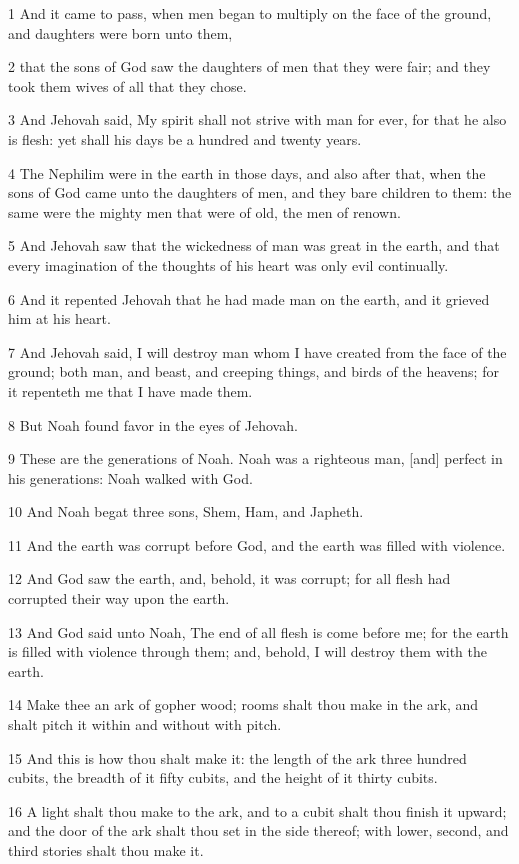 \par 1 And it came to pass, when men began to multiply on the face of the ground, and daughters were born unto them,
\par 2 that the sons of God saw the daughters of men that they were fair; and they took them wives of all that they chose.
\par 3 And Jehovah said, My spirit shall not strive with man for ever, for that he also is flesh: yet shall his days be a hundred and twenty years.
\par 4 The Nephilim were in the earth in those days, and also after that, when the sons of God came unto the daughters of men, and they bare children to them: the same were the mighty men that were of old, the men of renown.
\par 5 And Jehovah saw that the wickedness of man was great in the earth, and that every imagination of the thoughts of his heart was only evil continually.
\par 6 And it repented Jehovah that he had made man on the earth, and it grieved him at his heart.
\par 7 And Jehovah said, I will destroy man whom I have created from the face of the ground; both man, and beast, and creeping things, and birds of the heavens; for it repenteth me that I have made them.
\par 8 But Noah found favor in the eyes of Jehovah.
\par 9 These are the generations of Noah. Noah was a righteous man, [and] perfect in his generations: Noah walked with God.
\par 10 And Noah begat three sons, Shem, Ham, and Japheth.
\par 11 And the earth was corrupt before God, and the earth was filled with violence.
\par 12 And God saw the earth, and, behold, it was corrupt; for all flesh had corrupted their way upon the earth.
\par 13 And God said unto Noah, The end of all flesh is come before me; for the earth is filled with violence through them; and, behold, I will destroy them with the earth.
\par 14 Make thee an ark of gopher wood; rooms shalt thou make in the ark, and shalt pitch it within and without with pitch.
\par 15 And this is how thou shalt make it: the length of the ark three hundred cubits, the breadth of it fifty cubits, and the height of it thirty cubits.
\par 16 A light shalt thou make to the ark, and to a cubit shalt thou finish it upward; and the door of the ark shalt thou set in the side thereof; with lower, second, and third stories shalt thou make it.
